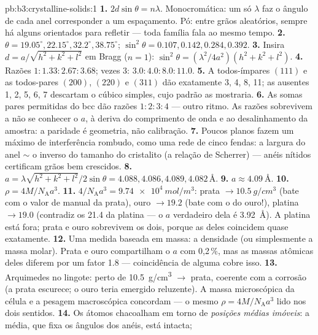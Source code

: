 \begin{solution}{pb:b3:crystalline-solids:1}
\textbf{1.} $2d\sin\theta = n\lambda$. Monocromática: um só
$\lambda$ faz o ângulo de cada anel corresponder a um espaçamento. Pó:
entre grãos aleatórios, sempre há alguns orientados para refletir ---
toda família fala ao mesmo tempo.
\textbf{2.} $\theta = 19.05^\circ, 22.15^\circ, 32.2^\circ,
38.75^\circ$; $\sin^2\theta = 0.107, 0.142, 0.284, 0.392$.
\textbf{3.} Insira $d = a/\sqrt{h^2+k^2+l^2}$ em Bragg
($n = 1$): $\sin^2\theta = (\lambda^2/4a^2)(h^2+k^2+l^2)$.
\textbf{4.} Razões $1 : 1.33 : 2.67 : 3.68$; vezes 3:
$3.0 : 4.0 : 8.0 : 11.0$.
\textbf{5.} A todos-ímpares $(111)$ e as todos-pares $(200)$, $(220)$
e $(311)$ dão exatamente 3, 4, 8, 11; as ausentes 1, 2, 5, 6, 7
descartam o cúbico simples, cujo padrão as mostraria.
\textbf{6.} As somas pares permitidas do bcc dão razões
$1:2:3:4$ --- outro ritmo. As razões sobrevivem a não se conhecer o
$a$, à deriva do comprimento de onda e ao desalinhamento da amostra: a
paridade é geometria, não calibração.
\textbf{7.} Poucos planos fazem um máximo de interferência rombudo,
como uma rede de cinco fendas: a largura do anel $\sim$ o inverso do
tamanho do cristalito (a relação de Scherrer) --- anéis nítidos
certificam grãos bem crescidos.
\textbf{8.} $a = \lambda\sqrt{h^2+k^2+l^2}/2\sin\theta = 4.088,
4.086, 4.089, 4.082\,\unit{\angstrom}$.
\textbf{9.} $a \approx \qty{4.09}{\angstrom}$.
\textbf{10.} $\rho = 4M/N_{\text{A}}a^3$.
\textbf{11.} $4/N_{\text{A}}a^3 = \qty{9.74e4}{mol/m^3}$:
prata $\to \qty{10.5}{g/cm^3}$ (bate com o valor de manual da
prata), ouro $\to 19.2$ (bate com o do ouro!), platina $\to 19.0$
(contradiz os 21.4 da platina --- o $a$ verdadeiro dela é
\qty{3.92}{\angstrom}). A platina está fora; prata e ouro
sobrevivem os dois, porque as  deles coincidem quase
exatamente.
\textbf{12.} Uma medida baseada em massa: a densidade (ou simplesmente
a massa molar). Prata e ouro compartilham o $a$ com 0,2\,\%, mas as
massas atômicas deles diferem por um fator 1.8 --- coincidência de 
alguma cobre isso.
\textbf{13.} Arquimedes no lingote: perto de \qty{10.5}{g/cm^3}
$\to$ prata, coerente com a corrosão (a prata escurece;
o ouro teria emergido reluzente). A massa microscópica da célula e a
pesagem macroscópica concordam --- o mesmo
$\rho = 4M/N_{\text{A}}a^3$ lido nos dois sentidos.
\textbf{14.} Os átomos chacoalham em torno de \emph{posições médias
imóveis}: a  média, que fixa os ângulos dos anéis, está intacta;

\end{solution}
